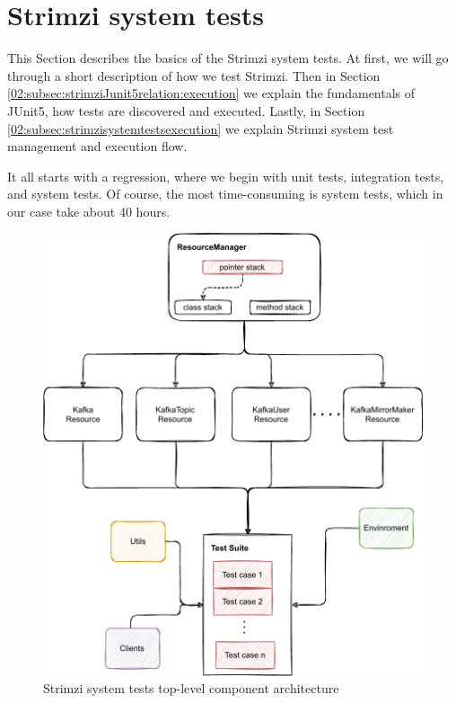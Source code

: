 \section{Strimzi system tests}
\label{02:sec:strimzisystemtests}

This Section describes the basics of the Strimzi system tests.
At first, we will go through a short description of how we test Strimzi.
Then in Section \ref{02:subsec:strimziJunit5relation:execution} we explain the fundamentals of JUnit5, how tests are discovered and executed. Lastly, in Section \ref{02:subsec:strimzisystemtestsexecution} we explain Strimzi system test management and execution flow. 

It all starts with a regression, where we begin with unit tests, integration tests, and system tests. Of course, the most time-consuming is system tests, which in our case take about 40 hours. 
\begin{figure}[!ht]
    \centering
    \includegraphics[scale=0.80]{obrazky-figures/02-preliminaries/04-strimzi-system-tests/01-architecture-overall.pdf}
    \caption{Strimzi system tests top-level component architecture}
    \label{02d:fig:strimzisystemtestarch}
\end{figure}
